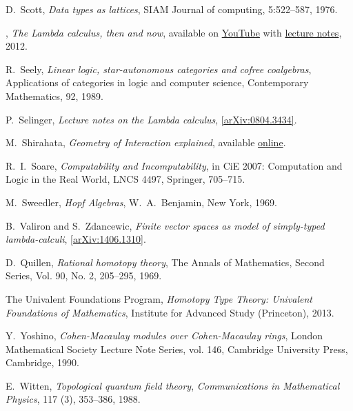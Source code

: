 \documentclass[english,letter paper,12pt,reqno]{article}
\theoremstyle{example}
\numberwithin{equation}{section}
\begin{document}
\begin{thebibliography}{BHLS03}
D.~Scott, \textsl{Data types as lattices}, SIAM Journal of computing, 5:522--587, 1976.

\bysame, \textsl{The {L}ambda calculus, then and now}, available on \href{http://www.youtube.com/watch?v=7cPtCpyBPNI}{YouTube} with \href{http://turing100.acm.org/lambda_calculus_timeline.pdf}{lecture notes}, 2012.

R.~Seely, \textsl{Linear logic, star-autonomous categories and cofree coalgebras}, Applications of categories in logic and computer science, Contemporary Mathematics, 92, 1989.

P.~Selinger, \textsl{Lecture notes on the {L}ambda calculus}, \href{http://arxiv.org/abs/0804.3434}{[arXiv:0804.3434]}.

M.~Shirahata, \textsl{Geometry of {I}nteraction explained}, available \href{http://www.kurims.kyoto-u.ac.jp/~hassei/algi-13/kokyuroku/19_shirahata.pdf}{online}.

R.~I.~Soare, \textsl{Computability and {I}ncomputability}, in CiE 2007: Computation and Logic in the Real World, LNCS 4497, Springer, 705--715.
  
M.~Sweedler, \textsl{Hopf Algebras}, W.~A.~Benjamin, New York, 1969.

B.~Valiron and S.~Zdancewic, \textsl{Finite vector spaces as model of simply-typed lambda-calculi}, \href{http://arxiv.org/abs/1406.1310v1}{[arXiv:1406.1310]}.

D.~Quillen, \textsl{Rational homotopy theory}, The Annals of Mathematics, Second Series, Vol. 90, No. 2, 205--295, 1969.

The Univalent Foundations Program, \textsl{Homotopy {T}ype {T}heory: {U}nivalent {F}oundations of {M}athematics}, Institute for Advanced Study (Princeton), 2013.

Y.~Yoshino, \emph{Cohen-{M}acaulay modules over {C}ohen-{M}acaulay rings},
  London Mathematical Society Lecture Note Series, vol. 146, Cambridge
  University Press, Cambridge, 1990. 
  
E.~Witten, \textsl{Topological quantum field theory}, \textsl{Communications in Mathematical Physics}, 117 (3), 353--386, 1988.

\end{thebibliography}
\end{document}
